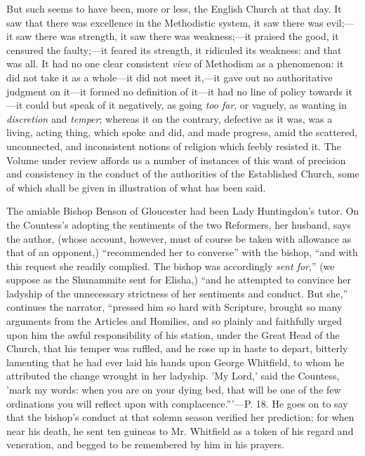 But such seems to have been, more or less, the
English Church at that day. It saw that there was excellence in the
Methodistic system, it saw there was evil;—it saw there was
strength, it saw there was weakness;—it praised the good, it
censured the faulty;—it feared its strength, it ridiculed its
weakness: and that was all. It had no one clear consistent \emph{view}
of Methodism as a phenomenon: it did not take it as a whole—it did
not meet it,—it gave out no authoritative judgment on it—it formed
no definition of it—it had no line of policy towards it—it could
but speak of it negatively, as going \emph{too far}, or vaguely, as
wanting in \emph{discretion} and \emph{temper}; whereas it on the
contrary, defective as it was, was a living, acting thing, which spoke
and did, and made progress, amid the scattered, unconnected, and
inconsistent notions of religion which feebly resisted it. The Volume
under review affords us a number of instances of this want of
precision and consistency in the conduct of the authorities of the
Established Church, some of which shall be given in illustration of
what has been said.

The amiable Bishop Benson of Gloucester had been
Lady Huntingdon's tutor. On the Countess's adopting the sentiments of
the two Reformers, her husband, says the author, (whose account,
however, must of course be taken with allowance as that of an
opponent,) ``recommended her to converse'' with the bishop, ``and with
this request she readily complied. The bishop was accordingly \emph{sent
for},'' (we suppose as the Shunammite sent for Elisha,) ``and he
attempted to convince her ladyship of the unnecessary strictness of
her sentiments and conduct. But she,'' continues the narrator, ``pressed
him so hard with Scripture, brought so many arguments from the
Articles and Homilies, and so plainly and faithfully urged upon him
the awful responsibility of his station, under the Great Head of the
Church, that his temper was ruffled, and he rose up in haste to
depart, bitterly lamenting that he had ever laid his hands upon George
Whitfield, to whom he attributed the change wrought in her
ladyship. 'My Lord,' said the Countess, 'mark my words: when you are
on your dying bed, that will be one of the few ordinations you will
reflect upon with complacence.'''—P. 18. He goes on to say that the
bishop's conduct at that solemn season verified her prediction; for
when near his death, he sent ten guineas to Mr. Whitfield as a token
of his regard and veneration, and begged to be remembered by him in
his prayers.

